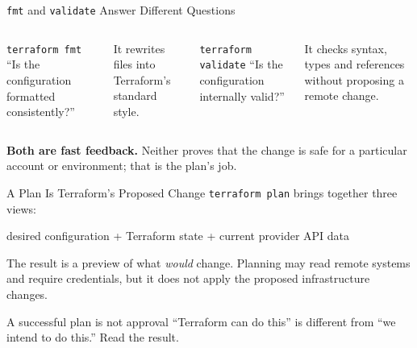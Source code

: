 \documentclass[aspectratio=169, xcolor=table]{beamer}
\begin{document}
\begin{frame}{\texttt{fmt} and \texttt{validate} Answer Different Questions}
  \begin{columns}[T]
    \begin{block}{\texttt{terraform fmt}}
      ``Is the configuration formatted consistently?''
    \end{block}

    It rewrites files into Terraform's standard style.

    \begin{block}{\texttt{terraform validate}}
      ``Is the configuration internally valid?''
    \end{block}

    It checks syntax, types and references without proposing a remote change.
  \end{columns}

  \vspace{1em}
  \textcolor{SecondaryAccent}{\textbf{Both are fast feedback.}} Neither proves that the
  change is safe for a particular account or environment; that is the plan's job.
\end{frame}

\begin{frame}{A Plan Is Terraform's Proposed Change}
  \texttt{terraform plan} brings together three views:

  \vspace{0.8em}
  \begin{center}
    desired configuration
    \quad + \quad
    Terraform state
    \quad + \quad
    current provider API data
  \end{center}

  \vspace{1em}
  The result is a preview of what \emph{would} change. Planning may read remote systems
  and require credentials, but it does not apply the proposed infrastructure changes.

  \begin{alertblock}{A successful plan is not approval}
    ``Terraform can do this'' is different from ``we intend to do this.'' Read the result.
  \end{alertblock}
\end{frame}
\end{document}
